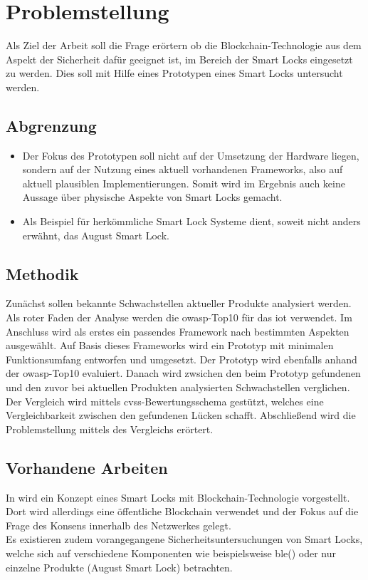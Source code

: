 \section{Problemstellung}
\label{sec:problem}
    Als Ziel der Arbeit soll die Frage erörtern ob die Block\-chain\--Tech\-no\-lo\-gie aus dem Aspekt der Sicherheit dafür geeignet ist, im Bereich der Smart Locks eingesetzt zu werden.
    Dies soll mit Hilfe eines Prototypen eines Smart Locks untersucht werden.
    
    \subsection{Abgrenzung}
    \label{sec:problem_limit}
    	\begin{itemize}
    		\item Der Fokus des Prototypen soll nicht auf der Umsetzung der Hardware liegen, sondern auf der Nutzung eines aktuell vorhandenen Frameworks, also auf aktuell plausiblen Implementierungen.
    		Somit wird im Ergebnis auch keine Aussage über physische Aspekte von Smart Locks gemacht.
    		\item Als Beispiel für herkömmliche Smart Lock Systeme dient, soweit nicht anders erwähnt, das August Smart Lock.
    	\end{itemize}

    \subsection{Methodik}
    \label{sec:problem_methods}
        Zunächst sollen bekannte Schwachstellen aktueller Produkte analysiert werden.
        Als roter Faden der Analyse werden die \gls{owasp}-Top10 für das \gls{iot}\cite{Miessler2015a} verwendet.
        Im Anschluss wird als erstes ein passendes Framework nach bestimmten Aspekten ausgewählt.
        Auf Basis dieses Frameworks wird ein Prototyp mit minimalen Funktionsumfang entworfen und umgesetzt.
        Der Prototyp wird ebenfalls anhand der \gls{owasp}-Top10 evaluiert.
        Danach wird zwsichen den beim Prototyp gefundenen und den zuvor bei aktuellen Produkten analysierten Schwachstellen verglichen.
        Der Vergleich wird mittels \gls{cvss}-Bewertungsschema gestützt, welches eine Vergleichbarkeit zwischen den gefundenen Lücken schafft.
        Abschließend wird die Problemstellung mittels des Vergleichs erörtert.
    
    \subsection{Vorhandene Arbeiten}
    \label{sec:problem_relatedWork}
        In \cite{Han2017} wird ein Konzept eines Smart Locks mit Blockchain-Technologie vorgestellt. 
        Dort wird allerdings eine öffentliche Blockchain verwendet und der Fokus auf die Frage des Konsens innerhalb des Netzwerkes gelegt. \\
        Es existieren zudem vorangegangene Sicherheitsuntersuchungen von Smart Locks, welche sich auf verschiedene Komponenten wie beispielsweise \gls{ble}(\cite{Rose2016}) oder nur einzelne Produkte (August Smart Lock\cite{Fuller2017,Ho2016,Ye2017}) betrachten.
